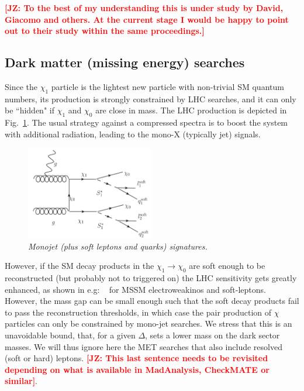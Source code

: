 \documentclass[11pt]{cernrep}
\def\JZ#1{{\bf  \textcolor{red}{[JZ: {#1}]}}}
\begin{document}
\JZ{To the best of my understanding this is under study by David, Giacomo and others. At the current stage I would be happy to point out to their study within the same proceedings.}


\subsection{Dark matter (missing energy) searches}
\label{subsec:mjet}
Since the $\chi_1$ particle is the lightest new particle with non-trivial SM quantum numbers, its production is strongly constrained by LHC searches, and it can only be ``hidden" if $\chi_1$ and $\chi_0$ are close in mass. The LHC production is depicted in Fig.~\ref{fig:MonoJet}. The usual strategy against a compressed spectra is to boost the system with additional radiation, leading to the mono-X (typically jet) signals. 

 \begin{figure}[!htp]
  \centering
  \includegraphics[width=0.5\textwidth]{./figures/MonoJet.png} 
  \caption{\it Monojet (plus soft leptons and quarks) signatures.}
\label{fig:MonoJet}
\end{figure}

However, if the SM decay products in the $\chi_1 \to \chi_0$ are soft enough to be reconstructed (but probably not to triggered on) the LHC sensitivity gets greatly enhanced, as shown in e.g: ~\cite{Schwaller:2013baa} for MSSM electroweakinos and soft-leptons. However, the mass gap can be small enough such that the soft decay products fail to pass the reconstruction thresholds, in which case the pair production of $\chi$ particles can only be constrained by  mono-jet searches. We stress that this is an unavoidable bound, that, for a given $\Delta$, sets a lower mass on the dark sector masses. We will thus ignore here the MET searches that also include resolved (soft or hard) leptons. \JZ{This last sentence needs to be revisited depending on what is available in MadAnalysis, CheckMATE or similar}.
\end{document}
